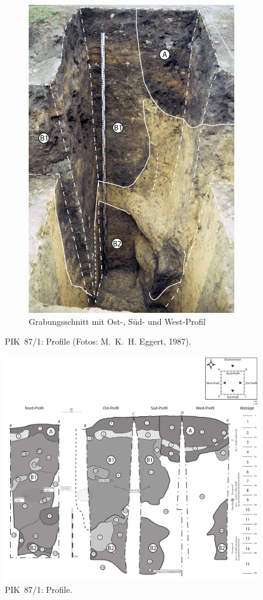 \begin{figure}[p]
\begin{subfigure}[t]{\columnwidth}
 \includegraphics[width=.8\columnwidth]{fig/PIK87-1_S-Profil_E87-020-2_2014-01-01.jpg}
 \caption{Grabungsschnitt mit Ost-, Süd- und West-Profil}
 \label{fig:PIK87-1_O+S+W-Prof}
\end{subfigure}
 \caption{PIK~87/1: Profile (Fotos: M.~K.~H. Eggert, 1987).}
 \label{fig:PIK87-1_ProfileFotos}
\end{figure}

\begin{figure}[p]
	\centering
	\includegraphics[width=.9\textwidth]{fig/PIK87-1.pdf}
	\caption{PIK~87/1: Profile.}
	\label{fig:PIK87-1_ProfileZeichnung}
\end{figure}

